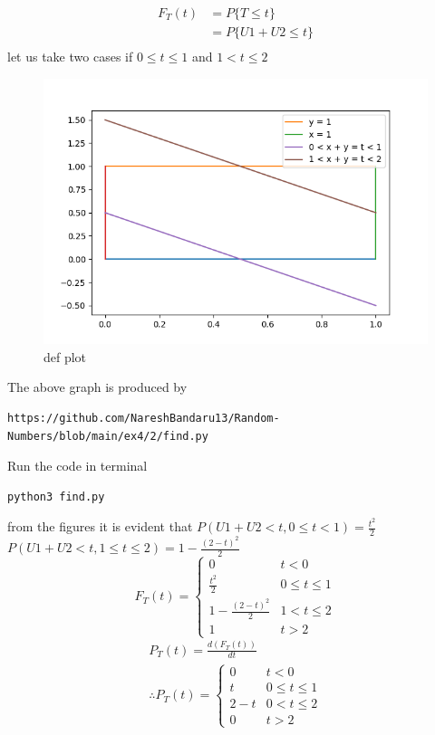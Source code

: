 \documentclass[journal,12pt,twocolumn]{IEEEtran}
\renewcommand\thesection{\arabic{section}}
\begin{document}
\begin{enumerate}[label=\thesection.\arabic*
,ref=\thesection.\theenumi]
  \begin{align*}
      F_T (t) &= P\{T \le t\} \\
       &= P\{ U1 + U2 \le t\} \\
  \end{align*}
let us take two cases if $0 \le t \le 1$ and
$1 < t \le 2$ \\
\begin{figure}[H]
    \centering
    \includegraphics[scale = 0.6]{cdf.png}
    \caption{def plot}
    \label{fig:my_defplot}
\end{figure}
The above graph is produced by
\begin{lstlisting}
https://github.com/NareshBandaru13/Random-Numbers/blob/main/ex4/2/find.py
\end{lstlisting}
Run the code in terminal
\begin{lstlisting}
python3 find.py
\end{lstlisting}
from the figures it is evident that
$P(U1+U2 < t ,0\le t <1) = \frac{t^2}{2}$ \\
$P(U1+U2 < t ,1\le t \le2) =1 - \frac{(2 -t)^2}{2}$ \\
\[
F_T (t) = 
\begin{cases}
0 & t<0\\
\frac{t^2}{2} & 0\leq t \leq 1\\
1-\frac{(2-t)^{2}}{2} & 1< t \leq 2\\
1 & t>2
\end{cases}
\]
\begin{align*}
P_{T}(t)=\frac{d(F_{T}(t))}{dt}\\
\therefore P_{T}(t)=
\begin{cases}
0 & t<0\\
t & 0\leq t \leq 1\\
2-t  & 0< t \leq 2\\
0 & t>2 
\end{cases}    
\end{align*}


\end{enumerate}
\end{document}
